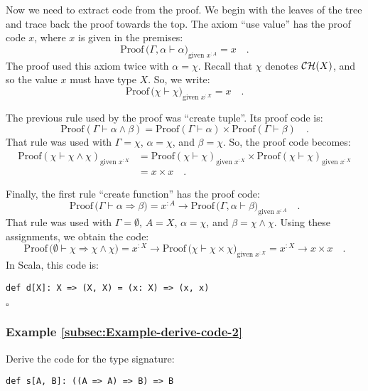 Now we need to extract code from the proof. We begin with the leaves
of the tree and trace back the proof towards the top. The axiom \textsf{``}use
value\textsf{''} has the proof code $x$, where $x$ is given in the premises:
\[
\text{Proof}\,\big(\Gamma,\alpha\vdash\alpha\big)_{\text{given }x^{:A}}=x\quad.
\]
The proof used this axiom twice with $\alpha=\chi$. Recall that $\chi$
denotes ${\cal CH}(X)$, and so the value $x$ must have type $X$.
So, we write:
\[
\text{Proof}\,\big(\chi\vdash\chi\big)_{\text{given }x^{:X}}=x\quad.
\]

The previous rule used by the proof was \textsf{``}create tuple\textsf{''}. Its proof
code is:
\[
\text{Proof}\left(\Gamma\vdash\alpha\wedge\beta\right)=\text{Proof}\left(\Gamma\vdash\alpha\right)\times\text{Proof}\left(\Gamma\vdash\beta\right)\quad.
\]
That rule was used with $\Gamma=\chi$, $\alpha=\chi$, and $\beta=\chi$.
So, the proof code becomes:
\begin{align*}
\text{Proof}\left(\chi\vdash\chi\wedge\chi\right)_{\text{given }x^{:X}} & =\text{Proof}\left(\chi\vdash\chi\right)_{\text{given }x^{:X}}\times\text{Proof}\left(\chi\vdash\chi\right)_{\text{given }x^{:X}}\\
 & =x\times x\quad.
\end{align*}

Finally, the first rule \textsf{``}create function\textsf{''} has the proof code:
\[
\text{Proof}\,\big(\Gamma\vdash\alpha\Rightarrow\beta\big)=x^{:A}\rightarrow\text{Proof}\,\big(\Gamma,\alpha\vdash\beta\big)_{\text{given }x^{:A}}\quad.
\]
That rule was used with $\Gamma=\emptyset$, $A=X$, $\alpha=\chi$,
and $\beta=\chi\wedge\chi$. Using these assignments, we obtain the
code:
\[
\text{Proof}\,\big(\emptyset\vdash\chi\Rightarrow\chi\wedge\chi\big)=x^{:X}\rightarrow\text{Proof}\,\big(\chi\vdash\chi\times\chi\big)_{\text{given }x^{:X}}=x^{:X}\rightarrow x\times x\quad.
\]
In Scala, this code is:
\begin{lstlisting}
def d[X]: X => (X, X) = (x: X) => (x, x) 
\end{lstlisting}
$\square$

\subsubsection{Example \label{subsec:Example-derive-code-2}\ref{subsec:Example-derive-code-2}}

Derive the code for the type signature:
\begin{lstlisting}
def s[A, B]: ((A => A) => B) => B
\end{lstlisting}


